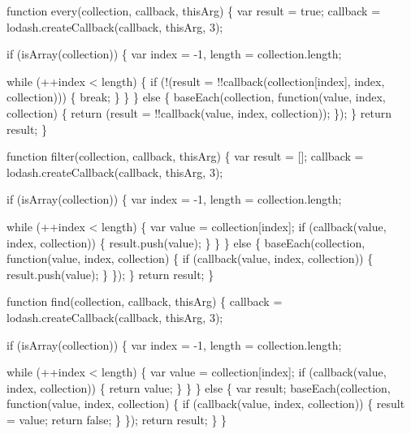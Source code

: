 \begin{DoxyCodeInclude}
    \textcolor{keyword}{function} every(collection, callback, thisArg) \{
      var result = \textcolor{keyword}{true};
      callback = lodash.createCallback(callback, thisArg, 3);

      \textcolor{keywordflow}{if} (isArray(collection)) \{
        var index = -1,
            length = collection.length;

        \textcolor{keywordflow}{while} (++index < length) \{
          \textcolor{keywordflow}{if} (!(result = !!callback(collection[index], index, collection))) \{
            \textcolor{keywordflow}{break};
          \}
        \}
      \} \textcolor{keywordflow}{else} \{
        baseEach(collection, \textcolor{keyword}{function}(value, index, collection) \{
          \textcolor{keywordflow}{return} (result = !!callback(value, index, collection));
        \});
      \}
      \textcolor{keywordflow}{return} result;
    \}

    \textcolor{keyword}{function} filter(collection, callback, thisArg) \{
      var result = [];
      callback = lodash.createCallback(callback, thisArg, 3);

      \textcolor{keywordflow}{if} (isArray(collection)) \{
        var index = -1,
            length = collection.length;

        \textcolor{keywordflow}{while} (++index < length) \{
          var value = collection[index];
          \textcolor{keywordflow}{if} (callback(value, index, collection)) \{
            result.push(value);
          \}
        \}
      \} \textcolor{keywordflow}{else} \{
        baseEach(collection, \textcolor{keyword}{function}(value, index, collection) \{
          \textcolor{keywordflow}{if} (callback(value, index, collection)) \{
            result.push(value);
          \}
        \});
      \}
      \textcolor{keywordflow}{return} result;
    \}

    \textcolor{keyword}{function} find(collection, callback, thisArg) \{
      callback = lodash.createCallback(callback, thisArg, 3);

      \textcolor{keywordflow}{if} (isArray(collection)) \{
        var index = -1,
            length = collection.length;

        \textcolor{keywordflow}{while} (++index < length) \{
          var value = collection[index];
          \textcolor{keywordflow}{if} (callback(value, index, collection)) \{
            \textcolor{keywordflow}{return} value;
          \}
        \}
      \} \textcolor{keywordflow}{else} \{
        var result;
        baseEach(collection, \textcolor{keyword}{function}(value, index, collection) \{
          \textcolor{keywordflow}{if} (callback(value, index, collection)) \{
            result = value;
            \textcolor{keywordflow}{return} \textcolor{keyword}{false};
          \}
        \});
        \textcolor{keywordflow}{return} result;
      \}
    \}


\end{DoxyCodeInclude}
